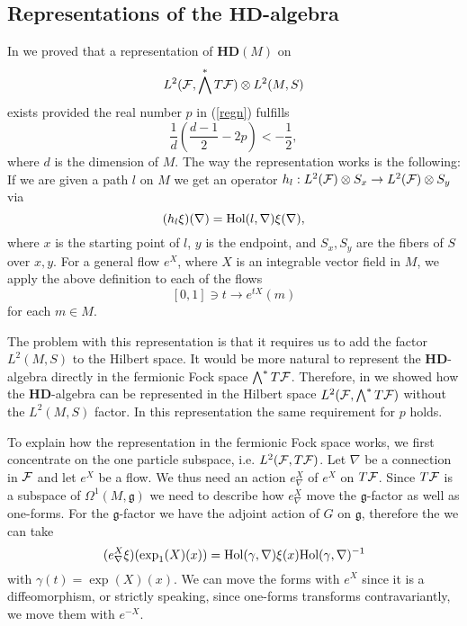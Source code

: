 \documentclass[letterpaper,11pt]{article}
\def\cf{{\cal F}}
\begin{document}
\subsection{Representations of the $\mathbf{HD}$-algebra}





In \cite{Aastrup:2017vrm} we proved that a representation of $\mathbf{HD}(M)$ on $$L^2 (\cf ,\bigwedge^* T\cf)\otimes L^2(M,S)  $$ exists provided the real number $p$ in (\ref{regn}) fulfills 
\begin{equation}\frac{1}{d} \left( \frac{d-1}{2}-2p\right)<-\frac12 , \label{betingelse}
\end{equation}
where $d$ is the dimension of $M$.
The way the representation works is the following: If we are given a path $l$ on $M$ we get an operator $h_l : L^2 (\cf)\otimes S_x \to L^2 (\cf)\otimes S_y$ via
$$(h_l\xi) (\nabla)=\hbox{Hol} (l,\nabla )\xi (\nabla) ,$$
where $x$ is the starting point of $l$, $y$ is the endpoint, and $S_x,S_y$ are the fibers of $S$ over $x,y$.
For a general flow $e^X$, where $X$ is an integrable vector field in $M$, we apply the above definition to each of the flows 
$$[0,1]\ni t\to e^{tX}(m) $$
for each $m\in M$.

The problem with this representation is that it requires us to add the factor $L^2(M,S)$ to the Hilbert space. It would be more natural to represent the $\mathbf{HD}$-algebra directly in the fermionic Fock space $\bigwedge^* T\cf$. 
Therefore, in \cite{Aastrup:2018coc} we showed how the $\mathbf{HD}$-algebra can be represented in the Hilbert space $L^2(\cf, \bigwedge^* T\cf)$ without the $L^2(M,S)$ factor. In this representation the same requirement for $p$ holds.






 
 To explain how the representation in the fermionic Fock space works, we first concentrate on the one particle subspace, i.e. $L^2(\cf, T\cf)$. Let $\nabla$ be a connection in $\cf$ and let $e^X$ be a flow. We thus need an action $e^X_\nabla$ of $e^X$ on $T\cf$. Since $T\cf$ is a subspace of $\Omega^1(M,\mathfrak{g})$ we need to describe how $e^X_\nabla$ move the $\mathfrak{g}$-factor as well as one-forms. For the $\mathfrak{g}$-factor we have the adjoint action of $G$ on $\mathfrak{g}$, therefore the we can take
 $$(e^X_\nabla \xi )(\exp_1(X)(x))=\hbox{Hol}(\gamma , \nabla) \xi (x) \hbox{Hol}(\gamma , \nabla)^{-1}$$
 with $\gamma(t)=\exp (X)(x)$.  We can move the forms with $e^X$ since it is a diffeomorphism, or strictly speaking, since one-forms transforms contravariantly, we move them with $e^{-X}$. 
 
\end{document}
